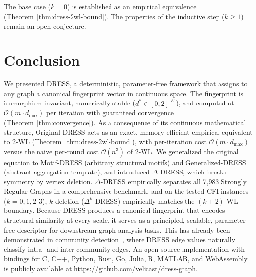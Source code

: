 \documentclass[11pt,a4paper]{article}
\begin{document}
The base case ($k = 0$) is established as an empirical equivalence (Theorem~\ref{thm:dress-2wl-bound}). The properties of the inductive step ($k \geq 1$) remain an open conjecture.


\section{Conclusion}
We presented DRESS, a deterministic, parameter-free framework that assigns to any graph a canonical fingerprint vector in continuous space. The fingerprint is isomorphism-invariant, numerically stable ($d^* \in [0,2]^{|E|}$), and computed at $\mathcal{O}(m \cdot d_{\max})$ per iteration with guaranteed convergence (Theorem~\ref{thm:convergence}). As a consequence of its continuous mathematical structure, Original-DRESS acts as an exact, memory-efficient empirical equivalent to 2-WL (Theorem~\ref{thm:dress-2wl-bound}), with per-iteration cost $\mathcal{O}(m \cdot d_{\max})$ versus the naive per-round cost $\mathcal{O}(n^3)$ of 2-WL. We generalized the original equation to Motif-DRESS (arbitrary structural motifs) and Generalized-DRESS (abstract aggregation template), and introduced $\Delta$-DRESS, which breaks symmetry by vertex deletion. $\Delta$-DRESS empirically separates all 7{,}983 Strongly Regular Graphs in a comprehensive benchmark, and on the tested CFI instances ($k = 0,1,2,3$), $k$-deletion ($\Delta^k$-DRESS) empirically matches the $(k{+}2)$-WL boundary. Because DRESS produces a canonical fingerprint that encodes structural similarity at every scale, it serves as a principled, scalable, parameter-free descriptor for downstream graph analysis tasks. This has already been demonstrated in community detection~\cite{castrillo2018dynamicstructuralsimilaritygraphs, castrillo2018community}, where DRESS edge values naturally classify intra- and inter-community edges. An open-source implementation with bindings for C, C++, Python, Rust, Go, Julia, R, MATLAB, and WebAssembly is publicly available at \url{https://github.com/velicast/dress-graph}.



\end{document}
